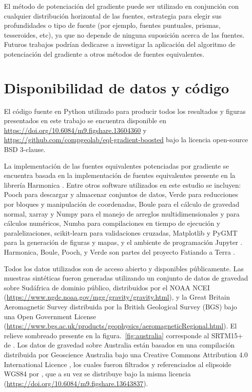 El método de potenciación del gradiente puede ser utilizado en conjunción con
cualquier distribución horizontal de las fuentes, estrategia para elegir sus
profundidades o tipo de fuente (por ejemplo, fuentes puntuales, prismas,
tesseroides, etc), ya que no depende de ninguna suposición acerca de las
fuentes.
Futuros trabajos podrían dedicarse a investigar la aplicación del algoritmo de
potenciación del gradiente a otros métodos de fuentes equivalentes.


\section{Disponibilidad de datos y código}

El código fuente en Python utilizado para producir todos los resultados
y figuras presentados en este trabajo se encuentra disponible en
\url{https://doi.org/10.6084/m9.figshare.13604360} y
\url{https://github.com/compgeolab/eql-gradient-boosted}
bajo la licencia open-source BSD 3-clause.

La implementación de las fuentes equivalentes potenciadas por gradiente se
encuentra basada en la implementación de fuentes equivalentes presente en la
librería Harmonica \citep{harmonica2021}.
Entre otros software utilizados en este estudio se incluyen:
Pooch \citep{pooch2020} para descargar y almacenar conjuntos de datos,
Verde \citep{verde2018} para reducciones por bloques y manipulación de
coordenadas,
Boule \citep{boule2020} para el cálculo de gravedad normal,
xarray \citep{xarray2017} y Numpy \citep{numpy2020}
para el manejo de arreglos multidimensionales y para cálculos numéricos,
Numba \citep{numba2015} para compilaciones en tiempo de ejecución
y paralelizaciones,
scikit-learn \citep{sklearn2011} para validaciones cruzadas,
Matplotlib \citep{matplotlib2007} y PyGMT \citep{pygmt2020}
para la generación de figuras y mapas,
y el ambiente de programación Jupyter \citep{jupyter2016}.
Harmonica, Boule, Pooch, y Verde son partes del proyecto Fatiando a Terra
\citep{fatiando2013}.

Todos los datos utilizados son de acceso abierto y disponibles públicamente.
Las muestras sintéticas fueron generadas utilizando un conjunto de datos de
gravedad sobre Sudáfrica de dominio público, distribuidos por el
NOAA NCEI (\url{https://www.ngdc.noaa.gov/mgg/gravity/gravity.html}),
y la Great Britain Aeromagnetic Survey distribuida por la
British Geological Survey (BGS) bajo una Open Government License
(\url{https://www.bgs.ac.uk/products/geophysics/aeromagneticRegional.html}).
El relieve sombreado presente en la figura.~\ref{fig:australia} corresponde al
SRTM15+ de \citet{tozer2019}.
Los datos de gravedad sobre Australia están basados en una compilación
distribuida por Geoscience Australia bajo una Creative Commons Attribution 4.0
International Licence \citep{wynne2018}, los cuales fueron filtrados
y referenciados al elipsoide WGS84 por \citet{australia_compilation}, que a su
vez se distribuye bajo la misma licencia
(\url{https://doi.org/10.6084/m9.figshare.13643837}).


